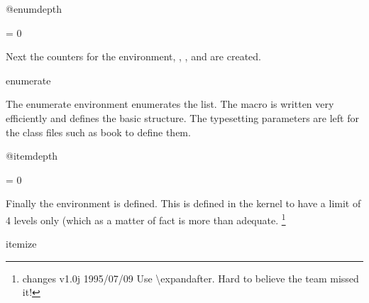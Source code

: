  \begin{docCommand}{@enumdepth}{}
 \end{docCommand}
     \begin{teX}
\newcount\@enumdepth \@enumdepth = 0
    \end{teX}
 

Next the counters for the  environment, , ,  and  are created.

    \begin{teX}
    \end{teX}


 \begin{docEnvironment}{enumerate}{}{}
 \end{docEnvironment}  
   The enumerate environment enumerates the list. The macro
  is written very efficiently and defines the basic structure. The
  typesetting parameters are left for the class files such as book
  to define them.

     \begin{teX}
\def\enumerate{%
  \ifnum \@enumdepth >\thr@@\@toodeep\else
    \advance\@enumdepth\@ne
    \edef\@enumctr{enum\romannumeral\the\@enumdepth}%
      \expandafter
      \list
        \refComname label\@enumctr\endcsname
        {\usecounter\@enumctr\def\makelabel##1{\hss\llap{##1}}}%
  \fi}
    \end{teX}

    \begin{teX}
\let\endenumerate =\endlist
    \end{teX}

 \begin{docCommand}{@itemdepth}{}
 \end{docCommand}
    \begin{teX}
\newcount\@itemdepth \@itemdepth = 0
    \end{teX}

Finally the  environment is defined. This is defined in the kernel to have a limit of 4 levels only (which as a matter
of fact is more than adequate. \footnote{changes v1.0j 1995/07/09 Use \textbackslash expandafter. 
Hard to believe the team missed it!}

 \begin{docEnvironment}{itemize}{}
 \end{docEnvironment}
     \begin{teX}
\def\itemize{%
  \ifnum \@itemdepth >\thr@@\@toodeep\else
    \advance\@itemdepth\@ne
    \edef\@itemitem{labelitem\romannumeral\the\@itemdepth}%
    \end{teX}
    

